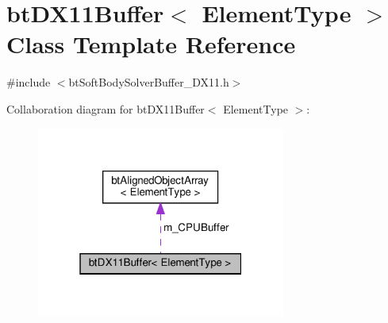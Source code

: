 \hypertarget{classbtDX11Buffer}{}\section{bt\+D\+X11\+Buffer$<$ Element\+Type $>$ Class Template Reference}
\label{classbtDX11Buffer}


{\ttfamily \#include $<$bt\+Soft\+Body\+Solver\+Buffer\+\_\+\+D\+X11.\+h$>$}



Collaboration diagram for bt\+D\+X11\+Buffer$<$ Element\+Type $>$\+:
\nopagebreak
\begin{figure}[H]
\begin{center}
\leavevmode
\includegraphics[width=232pt]{classbtDX11Buffer__coll__graph}
\end{center}
\end{figure}
